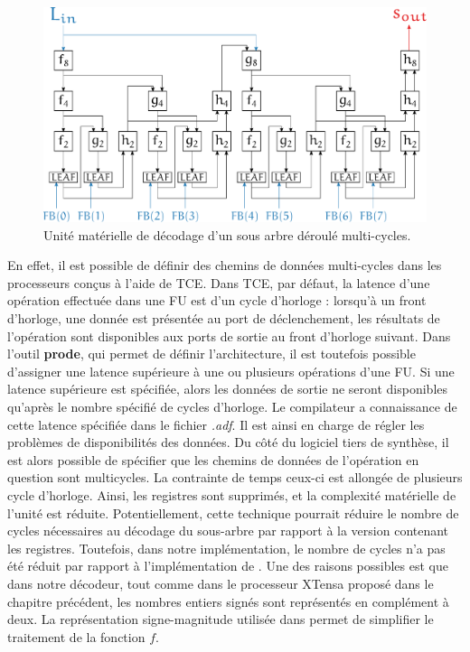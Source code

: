 \begin{figure}[htp]
	\centering
	\includegraphics[width=\textwidth]{main/ch4_fig/unrolled_multicycle}
	\caption{Unité matérielle de décodage d'un sous arbre déroulé multi-cycles.}
	\label{fig:unrolled_multicycle}
\end{figure}

En effet, il est possible de définir des chemins de données multi-cycles dans les processeurs conçus à l'aide de TCE. Dans TCE, par défaut, la latence d'une opération effectuée dans une FU est d'un cycle d'horloge : lorsqu'à un front d'horloge, une donnée est présentée au port de déclenchement, les résultats de l'opération sont disponibles aux ports de sortie au front d'horloge suivant. Dans l'outil \textbf{prode}, qui permet de définir l'architecture, il est toutefois possible d'assigner une latence supérieure à une ou plusieurs opérations d'une FU. Si une latence supérieure est spécifiée, alors les données de sortie ne seront disponibles qu'après le nombre spécifié de cycles d'horloge. Le compilateur a connaissance de cette latence spécifiée dans le fichier \textit{.adf}. Il est ainsi en charge de régler les problèmes de disponibilités des données. Du côté du logiciel tiers de synthèse, il est alors possible de spécifier que les chemins de données de l'opération en question sont multicycles. La contrainte de temps ceux-ci est allongée de plusieurs cycle d'horloge. Ainsi, les registres sont supprimés, et la complexité matérielle de l'unité est réduite. Potentiellement, cette technique pourrait réduire le nombre de cycles nécessaires au décodage du sous-arbre par rapport à la version contenant les registres. Toutefois, dans notre implémentation, le nombre de cycles n'a pas été réduit par rapport à l'implémentation de \cite{gal_scalable_2016}. Une des raisons possibles est que dans notre décodeur, tout comme dans le processeur XTensa proposé dans le chapitre précédent, les nombres entiers signés sont représentés en complément à deux. La représentation signe-magnitude utilisée dans \cite{gal_scalable_2016} permet de simplifier le traitement de la fonction $f$.

